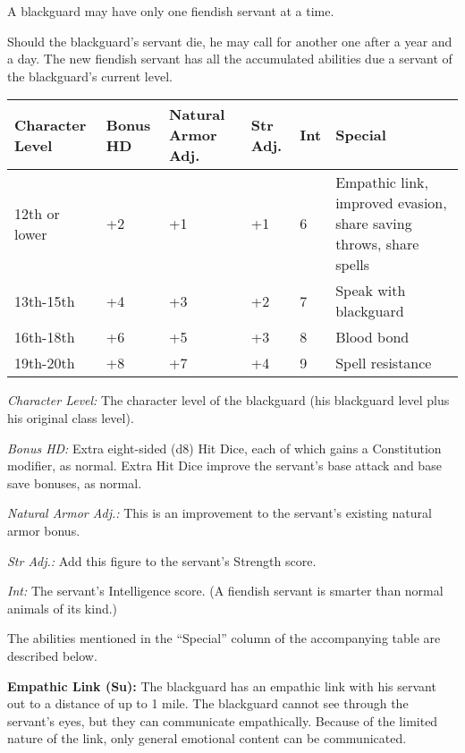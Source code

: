 \documentclass{article}
\begin{document}
A blackguard may have only one fiendish servant at a time.

Should the blackguard's servant die, he may call for another one after a year and 
a day. The new fiendish servant has all the accumulated abilities due a servant 
of the blackguard's current level.

\vspace{12pt}
\begin{tabular}{|>{\raggedright}p{45pt}|>{\raggedright}p{19pt}|>{\raggedright}p{33pt}|>{\raggedright}p{13pt}|>{\raggedright}p{10pt}|>{\raggedright}p{156pt}|}
\hline
C\textbf{haracter Level } & B\textbf{onus}\linebreak{}
\textbf{HD} & N\textbf{atural}\linebreak{}
\textbf{Armor Adj.} & S\textbf{tr}\linebreak{}
\textbf{Adj.} & I\textbf{nt} & S\textbf{pecial}\tabularnewline
\hline
12th or lower  & +2 & +1 & +1 & 6 & Empathic link, improved evasion, share saving 
throws, share spells\tabularnewline
\hline
13th-15th  & +4 & +3 & +2 & 7 & Speak with blackguard\tabularnewline
\hline
16th-18th  & +6 & +5 & +3 & 8 & Blood bond\tabularnewline
\hline
19th-20th  & +8 & +7 & +4 & 9 & Spell resistance\tabularnewline
\hline
\end{tabular}

\textit{Character Level: }The character level of the blackguard (his blackguard 
level plus his original class level).

\textit{Bonus HD: }Extra eight-sided (d8) Hit Dice, each of which gains a Constitution 
modifier, as normal. Extra Hit Dice improve the servant's base attack and base 
save bonuses, as normal.

\textit{Natural Armor Adj.: }This is an improvement to the servant's existing natural 
armor bonus.

\textit{Str Adj.: }Add this figure to the servant's Strength score.

\textit{Int: }The servant's Intelligence score. (A fiendish servant is smarter 
than normal animals of its kind.)

\vspace{12pt}
The abilities mentioned in the ``Special'' column of the accompanying table are 
described below.

\textbf{Empathic Link (Su): }The blackguard has an empathic link with his servant 
out to a distance of up to 1 mile. The blackguard cannot see through the servant's 
eyes, but they can communicate empathically. Because of the limited nature of the 
link, only general emotional content can be communicated.
\end{document}

